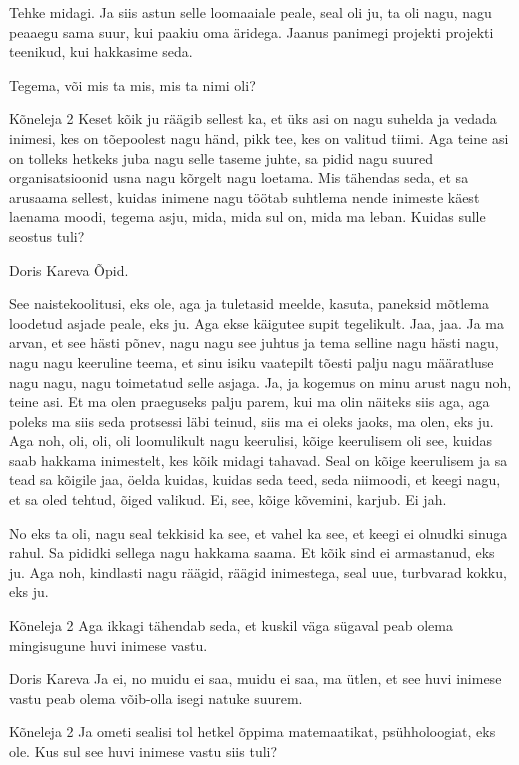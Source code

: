 Tehke midagi. Ja siis astun selle loomaaiale peale, seal oli ju, ta oli nagu, nagu peaaegu sama suur, kui paakiu oma äridega. Jaanus panimegi projekti projekti teenikud, kui hakkasime seda. 

Tegema, või mis ta mis, mis ta nimi oli? 

Kõneleja 2
Keset kõik ju räägib sellest ka, et üks asi on nagu suhelda ja vedada inimesi, kes on tõepoolest nagu händ, pikk tee, kes on valitud tiimi. Aga teine asi on tolleks hetkeks juba nagu selle taseme juhte, sa pidid nagu suured organisatsioonid usna nagu kõrgelt nagu loetama. Mis tähendas seda, et sa arusaama sellest, kuidas inimene nagu töötab suhtlema nende inimeste käest laenama moodi, tegema asju, mida, mida sul on, mida ma leban. Kuidas sulle seostus tuli? 

Doris Kareva
Õpid. 

See naistekoolitusi, eks ole, aga ja tuletasid meelde, kasuta, paneksid mõtlema loodetud asjade peale, eks ju. Aga ekse käigutee supit tegelikult. Jaa, jaa. Ja ma arvan, et see hästi põnev, nagu nagu see juhtus ja tema selline nagu hästi nagu, nagu nagu keeruline teema, et sinu isiku vaatepilt tõesti palju nagu määratluse nagu nagu, nagu toimetatud selle asjaga. Ja, ja kogemus on minu arust nagu noh, teine asi. Et ma olen praeguseks palju parem, kui ma olin näiteks siis aga, aga poleks ma siis seda protsessi läbi teinud, siis ma ei oleks jaoks, ma olen, eks ju. Aga noh, oli, oli, oli loomulikult nagu keerulisi, kõige keerulisem oli see, kuidas saab hakkama inimestelt, kes kõik midagi tahavad. Seal on kõige keerulisem ja sa tead sa kõigile jaa, öelda kuidas, kuidas seda teed, seda niimoodi, et keegi nagu, et sa oled tehtud, õiged valikud. Ei, see, kõige kõvemini, karjub. Ei jah. 

No eks ta oli, nagu seal tekkisid ka see, et vahel ka see, et keegi ei olnudki sinuga rahul. Sa pididki sellega nagu hakkama saama. Et kõik sind ei armastanud, eks ju. Aga noh, kindlasti nagu räägid, räägid inimestega, seal uue, turbvarad kokku, eks ju. 

Kõneleja 2
Aga ikkagi tähendab seda, et kuskil väga sügaval peab olema mingisugune huvi inimese vastu. 

Doris Kareva
Ja ei, no muidu ei saa, muidu ei saa, ma ütlen, et see huvi inimese vastu peab olema võib-olla isegi natuke suurem. 

Kõneleja 2
Ja ometi sealisi tol hetkel õppima matemaatikat, psühholoogiat, eks ole. Kus sul see huvi inimese vastu siis tuli? 

